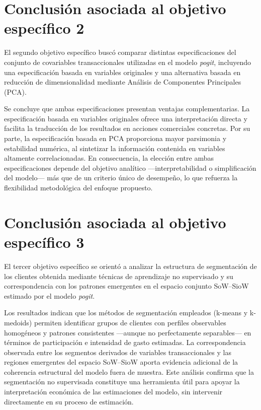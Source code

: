 \section{Conclusión asociada al objetivo específico 2}

El segundo objetivo específico buscó comparar distintas especificaciones del conjunto de covariables transaccionales utilizadas en el modelo \emph{pogit}, incluyendo una especificación basada en variables originales y una alternativa basada en reducción de dimensionalidad mediante Análisis de Componentes Principales (PCA).

Se concluye que ambas especificaciones presentan ventajas complementarias. La especificación basada en variables originales ofrece una interpretación directa y facilita la traducción de los resultados en acciones comerciales concretas. Por su parte, la especificación basada en PCA proporciona mayor parsimonia y estabilidad numérica, al sintetizar la información contenida en variables altamente correlacionadas. En consecuencia, la elección entre ambas especificaciones depende del objetivo analítico —interpretabilidad o simplificación del modelo— más que de un criterio único de desempeño, lo que refuerza la flexibilidad metodológica del enfoque propuesto.

\section{Conclusión asociada al objetivo específico 3}

El tercer objetivo específico se orientó a analizar la estructura de segmentación de los clientes obtenida mediante técnicas de aprendizaje no supervisado y su correspondencia con los patrones emergentes en el espacio conjunto SoW--SioW estimado por el modelo \emph{pogit}.

Los resultados indican que los métodos de segmentación empleados (k-means y k-medoids) permiten identificar grupos de clientes con perfiles observables homogéneos y patrones consistentes —aunque no perfectamente separables— en términos de participación e intensidad de gasto estimadas. La correspondencia observada entre los segmentos derivados de variables transaccionales y las regiones emergentes del espacio SoW--SioW aporta evidencia adicional de la coherencia estructural del modelo fuera de muestra. Este análisis confirma que la segmentación no supervisada constituye una herramienta útil para apoyar la interpretación económica de las estimaciones del modelo, sin intervenir directamente en su proceso de estimación.























